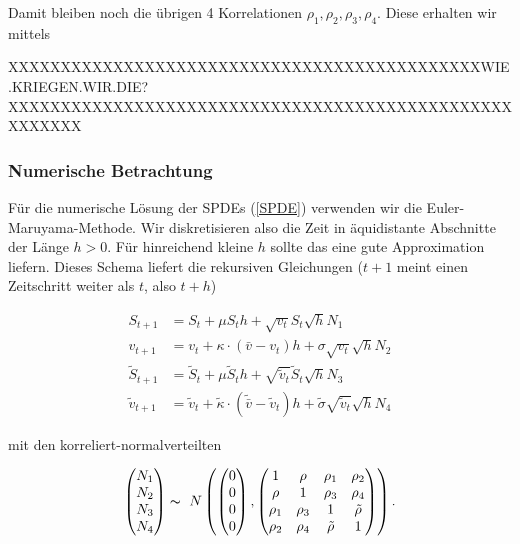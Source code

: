 \documentclass[12pt]{article}
\begin{document}
Damit bleiben noch die übrigen 4 Korrelationen $\rho_1, \rho_2, \rho_3,\rho_4$. Diese erhalten wir mittels

XXXXXXXXXXXXXXXXXXXXXXXXXXXXXXXXXXXXXXXXXXXXXWIE.KRIEGEN.WIR.DIE?XXXXXXXXXXXXXXXXXXXXXXXXXXXXXXXXXXXXXXXXXXXXXXXXXXXXXXX


\subsubsection{Numerische Betrachtung}

Für die numerische Lösung der SPDEs (\ref{SPDE}) verwenden wir die Euler-Maruyama-Methode. Wir diskretisieren also die Zeit in äquidistante Abschnitte der Länge $h>0$. Für hinreichend kleine $h$ sollte das eine gute Approximation liefern. Dieses Schema liefert die rekursiven Gleichungen ($t+1$ meint einen Zeitschritt weiter als $t$, also $t+h$)

\begin{align} \label{EMSPDE}
S_{t+1} &= S_t +\mu S_t h + \sqrt{v_t} S_t \sqrt{h} N_1 \\
v_{t+1} &= v_t +\kappa\cdot(\bar{v}-v_t) h + \sigma\sqrt{v_t}\sqrt{h} N_2\\
\tilde{S}_{t+1} &= \tilde{S}_t +\mu \tilde{S}_t h + \sqrt{\tilde{v}_t} \tilde{S}_t \sqrt{h} N_3 \\
\tilde{v}_{t+1} &= \tilde{v}_t +\tilde{\kappa}\cdot(\tilde{\bar{v}}-\tilde{v}_t) h + \tilde{\sigma}\sqrt{\tilde{v}_t}\sqrt{h} N_4
\end{align}

mit den korreliert-normalverteilten

\begin{align*}
\left(\begin{matrix}
N_1\\N_2\\N_3\\N_4
\end{matrix}\right)
\thicksim \
N\left(
\left(\begin{matrix}
0\\0\\0\\0
\end{matrix}\right),
\left(\begin{matrix}
1& \rho& \rho_1& \rho_2\\
\rho& 1& \rho_3& \rho_4\\
\rho_1& \rho_3& 1& \tilde{\rho}\\
\rho_2& \rho_4& \tilde{\rho}& 1
\end{matrix}\right)
\right).
\end{align*}
\end{document}
